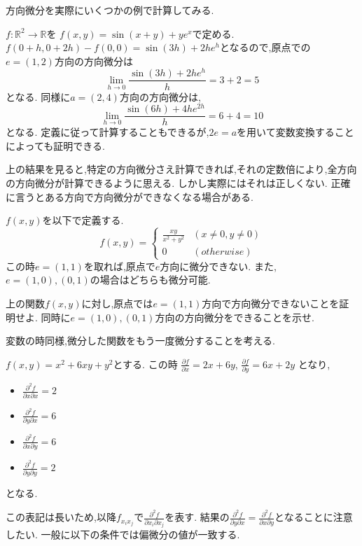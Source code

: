 方向微分を実際にいくつかの例で計算してみる.
\begin{epl}
$f: \mathbb{R}^2 \to \mathbb{R}$を
$f(x, y) = \sin(x+y) + ye^x$で定める.
$f(0+h, 0+2h) - f(0, 0) = \sin(3h) + 2he^h$となるので,原点での$e = (1 ,2)$方向の方向微分は
\begin{equation*}
\lim_{h \to 0} \frac{\sin(3h) + 2he^h }{h} = 3 + 2 = 5
\end{equation*}
となる.
同様に$a = (2, 4)$方向の方向微分は,
\begin{equation*}
\lim_{h \to 0} \frac{\sin(6h) + 4he^{2h} }{h} = 6 + 4 = 10
\end{equation*}
となる.
定義に従って計算することもできるが,$2e = a$を用いて変数変換することによっても証明できる.
\end{epl}

上の結果を見ると,特定の方向微分さえ計算できれば,それの定数倍により,全方向の方向微分が計算できるように思える.
しかし実際にはそれは正しくない.
正確に言うとある方向で方向微分ができなくなる場合がある.
\begin{epl}
$f(x, y)$を以下で定義する.
\begin{equation*}
  f(x,y) = \begin{cases}
  \frac{xy}{x^2 + y^2}  & (x \neq 0, y \neq 0) \\
  0  & (otherwise)
  \end{cases}
\end{equation*}
この時$e = (1, 1)$を取れば,原点で$e$方向に微分できない.
また,$e = (1, 0), (0, 1)$の場合はどちらも微分可能.
\end{epl}


\begin{exs}
上の関数$f(x,y)$に対し,原点では$e = (1, 1)$方向で方向微分できないことを証明せよ.
同時に$e =(1, 0), (0, 1)$方向の方向微分をできることを示せ.
\end{exs}

変数の時同様,微分した関数をもう一度微分することを考える.
\begin{epl}
$f(x, y) = x^2 + 6xy + y^2$とする.
この時
$\frac{\partial f}{\partial x} = 2x + 6y$,
$\frac{\partial f}{\partial y} = 6x + 2y$
となり,
\begin{itemize}
\item $\frac{\partial^2f}{\partial x \partial x} = 2$
\item $\frac{\partial^2f}{\partial y \partial x} = 6$
\item $\frac{\partial^2f}{\partial x \partial y} = 6$
\item $\frac{\partial^2f}{\partial y \partial y} = 2$
\end{itemize}
となる.
\end{epl}
この表記は長いため,以降$f_{x_ix_j}$で$\frac{\partial^2f}{\partial x_i \partial x_j}$を表す.
結果の$\frac{\partial^2f}{\partial y \partial x} = \frac{\partial^2f}{\partial x \partial y}$となることに注意したい.
一般に以下の条件では偏微分の値が一致する.

